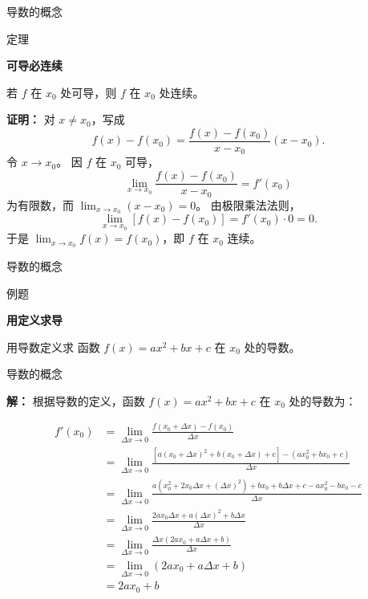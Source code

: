 \documentclass[aspectratio=169,10pt,fontset=fandol]{ctexbeamer}
\begin{document}
\begin{frame}[t,fragile]{导数的概念}
\small
\begin{block}{定理}
{\small
\textbf{可导必连续}\par

若 $f$ 在 $x_0$ 处可导，则 $f$ 在 $x_0$ 处连续。

}
\end{block}
\pause
{\small
\textbf{证明：}
对 $x\neq x_0$，写成
\[
f(x)-f(x_0)=\frac{f(x)-f(x_0)}{x-x_0}(x-x_0).
\]
令 $x\to x_0$。 因 $f$ 在 $x_0$ 可导，
\[
\lim_{x\to x_0}\frac{f(x)-f(x_0)}{x-x_0}=f'(x_0)
\]
为有限数，而 $\lim_{x\to x_0}(x-x_0)=0$。 由极限乘法法则，
\[
\lim_{x\to x_0}[f(x)-f(x_0)]=f'(x_0)\cdot0=0.
\]
于是 $\lim_{x\to x_0}f(x)=f(x_0)$，即 $f$ 在 $x_0$ 连续。

}
\end{frame}
\begin{frame}[t,fragile]{导数的概念}
\footnotesize
\begin{block}{例题}
{\footnotesize
\textbf{用定义求导}\par

用导数定义求 函数 $f(x) = ax^2 + bx + c$ 在 $x_0$ 处的导数。

}
\end{block}
\end{frame}
\begin{frame}[t,fragile]{导数的概念}
\footnotesize
{\footnotesize
\textbf{解：}
根据导数的定义，函数 $f(x) = ax^2 + bx + c$ 在 $x_0$ 处的导数为：

\begin{align*}
	f'(x_0) &= \lim_{\Delta x \to 0} \frac{f(x_0 + \Delta x) - f(x_0)}{\Delta x} \\
	&= \lim_{\Delta x \to 0} \frac{[a(x_0 + \Delta x)^2 + b(x_0 + \Delta x) + c] - (ax_0^2 + bx_0 + c)}{\Delta x} \\
	&= \lim_{\Delta x \to 0} \frac{a(x_0^2 + 2x_0\Delta x + (\Delta x)^2) + bx_0 + b\Delta x + c - ax_0^2 - bx_0 - c}{\Delta x} \\
	&= \lim_{\Delta x \to 0} \frac{2ax_0\Delta x + a(\Delta x)^2 + b\Delta x}{\Delta x} \\
	&= \lim_{\Delta x \to 0} \frac{\Delta x(2ax_0 + a\Delta x + b)}{\Delta x} \\
	&= \lim_{\Delta x \to 0} (2ax_0 + a\Delta x + b) \\
	&= 2ax_0 + b
\end{align*}

}
\end{frame}
\end{document}
